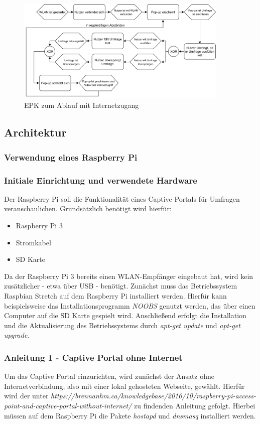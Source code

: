 \begin{figure}[H]
\centering
\includegraphics[width=0.9\textwidth]{images/captiveportal_EPK2}
\caption[EPK zum Ablauf mit Internetzugang]{EPK zum Ablauf mit Internetzugang}
\end{figure}
\subsection{Architektur}
\subsubsection{Verwendung eines Raspberry Pi}
\subsubsection*{Initiale Einrichtung und verwendete Hardware}
Der Raspberry Pi soll die Funktionalität eines Captive Portals für Umfragen veranschaulichen. Grundsätzlich benötigt wird hierfür:
\begin{itemize}
\item Raspberry Pi 3
\item Stromkabel
\item SD Karte
\end{itemize}

Da der Raspberry Pi 3 bereits einen WLAN-Empfänger eingebaut hat, wird kein zusätzlicher - etwa über USB - benötigt. Zunächst muss das Betriebssystem Raspbian Stretch auf dem Raspberry Pi  installiert werden. Hierfür kann beispielsweise das Installationsprogramm \textit{NOOBS} genutzt werden, das über einen Computer auf die SD Karte gespielt wird. Anschließend erfolgt die Installation und die Aktualisierung des Betriebssystems durch \textit{apt-get update} und \textit{apt-get upgrade}.

\subsubsection*{Anleitung 1 - Captive Portal ohne Internet}
Um das Captive Portal einzurichten, wird zunächst der Ansatz ohne Internetverbindung, also mit einer lokal gehosteten Webseite, gewählt. Hierfür wird der unter \textit{https://brennanhm.ca/knowledgebase/2016/10/raspberry-pi-access-point-and-captive-portal-without-internet/} zu findenden Anleitung gefolgt. Hierbei müssen auf dem Raspberry Pi die Pakete \textit{hostapd} und \textit{dnsmasq} installiert werden.

